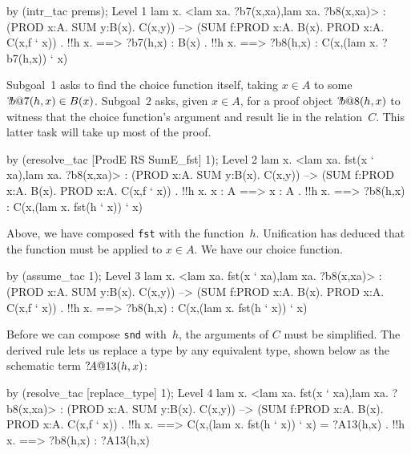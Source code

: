 \begin{ttbox}
by (intr_tac prems);
{\out Level 1}
{\out lam x. <lam xa. ?b7(x,xa),lam xa. ?b8(x,xa)>}
{\out : (PROD x:A. SUM y:B(x). C(x,y)) -->}
{\out   (SUM f:PROD x:A. B(x). PROD x:A. C(x,f ` x))}
\ttbreak
{. !!h x.}
{ ==>}
{\out        ?b7(h,x) : B(x)}
\ttbreak
{. !!h x.}
{ ==>}
{\out        ?b8(h,x) : C(x,(lam x. ?b7(h,x)) ` x)}
\end{ttbox}
Subgoal~1 asks to find the choice function itself, taking $x\in A$ to some
${?\!b@7}(h,x)\in B(x)$.  Subgoal~2 asks, given $x\in A$, for a proof
object ${?\!b@8}(h,x)$ to witness that the choice function's argument and
result lie in the relation~$C$.  This latter task will take up most of the
proof.
\begin{ttbox}
by (eresolve_tac [ProdE RS SumE_fst] 1);
{\out Level 2}
{\out lam x. <lam xa. fst(x ` xa),lam xa. ?b8(x,xa)>}
{\out : (PROD x:A. SUM y:B(x). C(x,y)) -->}
{\out   (SUM f:PROD x:A. B(x). PROD x:A. C(x,f ` x))}
\ttbreak
{. !!h x. x : A ==> x : A}
{. !!h x.}
{ ==>}
{\out        ?b8(h,x) : C(x,(lam x. fst(h ` x)) ` x)}
\end{ttbox}
Above, we have composed {\tt fst} with the function~$h$.  Unification
has deduced that the function must be applied to $x\in A$.  We have our
choice function.
\begin{ttbox}
by (assume_tac 1);
{\out Level 3}
{\out lam x. <lam xa. fst(x ` xa),lam xa. ?b8(x,xa)>}
{\out : (PROD x:A. SUM y:B(x). C(x,y)) -->}
{\out   (SUM f:PROD x:A. B(x). PROD x:A. C(x,f ` x))}
{. !!h x.}
{ ==>}
{\out        ?b8(h,x) : C(x,(lam x. fst(h ` x)) ` x)}
\end{ttbox}
Before we can compose {\tt snd} with~$h$, the arguments of $C$ must be
simplified.  The derived rule  lets us replace a type
by any equivalent type, shown below as the schematic term ${?\!A@{13}}(h,x)$:
\begin{ttbox}
by (resolve_tac [replace_type] 1);
{\out Level 4}
{\out lam x. <lam xa. fst(x ` xa),lam xa. ?b8(x,xa)>}
{\out : (PROD x:A. SUM y:B(x). C(x,y)) -->}
{\out   (SUM f:PROD x:A. B(x). PROD x:A. C(x,f ` x))}
\ttbreak
{. !!h x.}
{ ==>}
{\out        C(x,(lam x. fst(h ` x)) ` x) = ?A13(h,x)}
\ttbreak
{. !!h x.}
{ ==>}
{\out        ?b8(h,x) : ?A13(h,x)}
\end{ttbox}
